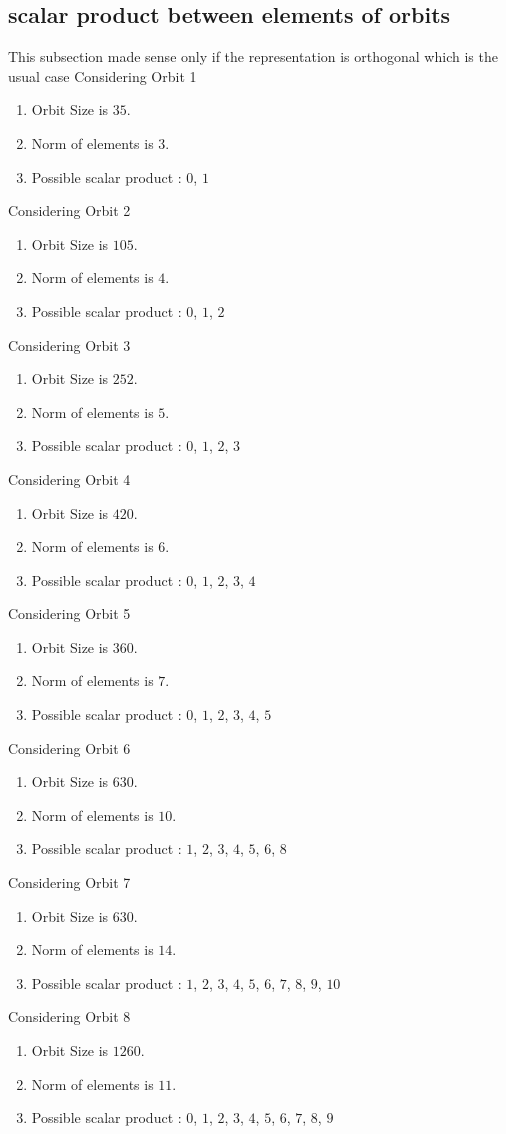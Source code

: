 \documentclass[12pt]{article}
\begin{document}
\subsection{scalar product between elements of orbits}
\noindent This subsection made sense only if the representation is orthogonal which is the usual case
Considering Orbit 1
\begin{enumerate}
\item Orbit Size is $35$.
\item Norm of elements is $3$.
\item Possible scalar product : $0$, $1$
\end{enumerate}
Considering Orbit 2
\begin{enumerate}
\item Orbit Size is $105$.
\item Norm of elements is $4$.
\item Possible scalar product : $0$, $1$, $2$
\end{enumerate}
Considering Orbit 3
\begin{enumerate}
\item Orbit Size is $252$.
\item Norm of elements is $5$.
\item Possible scalar product : $0$, $1$, $2$, $3$
\end{enumerate}
Considering Orbit 4
\begin{enumerate}
\item Orbit Size is $420$.
\item Norm of elements is $6$.
\item Possible scalar product : $0$, $1$, $2$, $3$, $4$
\end{enumerate}
Considering Orbit 5
\begin{enumerate}
\item Orbit Size is $360$.
\item Norm of elements is $7$.
\item Possible scalar product : $0$, $1$, $2$, $3$, $4$, $5$
\end{enumerate}
Considering Orbit 6
\begin{enumerate}
\item Orbit Size is $630$.
\item Norm of elements is $10$.
\item Possible scalar product : $1$, $2$, $3$, $4$, $5$, $6$, $8$
\end{enumerate}
Considering Orbit 7
\begin{enumerate}
\item Orbit Size is $630$.
\item Norm of elements is $14$.
\item Possible scalar product : $1$, $2$, $3$, $4$, $5$, $6$, $7$, $8$, $9$, $10$
\end{enumerate}
Considering Orbit 8
\begin{enumerate}
\item Orbit Size is $1260$.
\item Norm of elements is $11$.
\item Possible scalar product : $0$, $1$, $2$, $3$, $4$, $5$, $6$, $7$, $8$, $9$
\end{enumerate}
\end{document}
